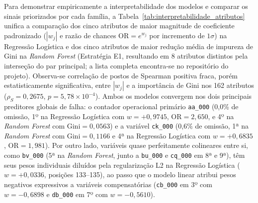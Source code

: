 \documentclass[conference]{IEEEtran}
\begin{document}
Para demonstrar empiricamente a interpretabilidade dos modelos e comparar os sinais priorizados por cada família, a Tabela~\ref{tab:interpretabilidade_atributos} unifica a comparação dos cinco atributos de maior magnitude de coeficiente padronizado ($|w_j|$ e razão de chances $\text{OR} = e^{w_j}$ por incremento de $1\sigma$) na Regressão Logística e dos cinco atributos de maior redução média de impureza de Gini na \textit{Random Forest} (Estratégia E1, resultando em 8 atributos distintos pela interseção do par principal; a lista completa encontra-se no repositório do projeto). Observa-se correlação de postos de Spearman positiva fraca, porém estatisticamente significativa, entre $|w_j|$ e a importância de Gini nos 162 atributos ($\rho_S = 0{,}2675$, $p = 5{,}78 \times 10^{-4}$). Ambos os modelos convergem nos dois principais preditores globais de falha: o contador operacional primário \texttt{aa\_000} (0,0\% de omissão, 1º na Regressão Logística com $w = +0{,}9745$, $\text{OR} = 2{,}650$, e 4º na \textit{Random Forest} com $\text{Gini} = 0{,}0563$) e a variável \texttt{ck\_000} (0,6\% de omissão, 1ª na \textit{Random Forest} com $\text{Gini} = 0{,}1166$ e 4ª na Regressão Logística com $w = +0{,}6835$, $\text{OR} = 1{,}981$). Por outro lado, variáveis quase perfeitamente colineares entre si, como \texttt{bv\_000} (5ª na \textit{Random Forest}, junto a \texttt{bu\_000} e \texttt{cq\_000} em 8ª e 9ª), têm seus pesos individuais diluídos pela regularização L2 na Regressão Logística ($w = +0{,}0336$, posições 133--135), ao passo que o modelo linear atribui pesos negativos expressivos a variáveis compensatórias (\texttt{cb\_000} em 3º com $w = -0{,}6898$ e \texttt{db\_000} em 7º com $w = -0{,}5610$).
\end{document}
